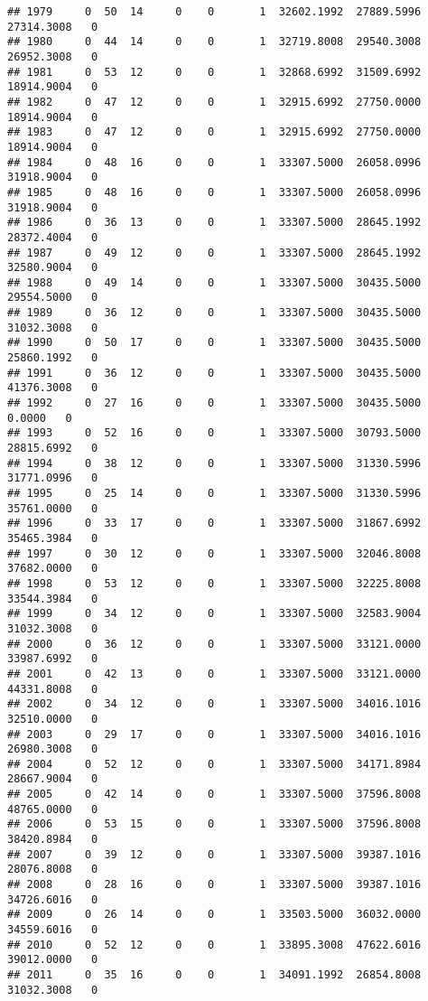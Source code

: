 \documentclass[
]{article}
\begin{document}
\begin{enumerate}
\begin{verbatim}
## 1979     0  50  14     0    0       1  32602.1992  27889.5996  27314.3008   0
## 1980     0  44  14     0    0       1  32719.8008  29540.3008  26952.3008   0
## 1981     0  53  12     0    0       1  32868.6992  31509.6992  18914.9004   0
## 1982     0  47  12     0    0       1  32915.6992  27750.0000  18914.9004   0
## 1983     0  47  12     0    0       1  32915.6992  27750.0000  18914.9004   0
## 1984     0  48  16     0    0       1  33307.5000  26058.0996  31918.9004   0
## 1985     0  48  16     0    0       1  33307.5000  26058.0996  31918.9004   0
## 1986     0  36  13     0    0       1  33307.5000  28645.1992  28372.4004   0
## 1987     0  49  12     0    0       1  33307.5000  28645.1992  32580.9004   0
## 1988     0  49  14     0    0       1  33307.5000  30435.5000  29554.5000   0
## 1989     0  36  12     0    0       1  33307.5000  30435.5000  31032.3008   0
## 1990     0  50  17     0    0       1  33307.5000  30435.5000  25860.1992   0
## 1991     0  36  12     0    0       1  33307.5000  30435.5000  41376.3008   0
## 1992     0  27  16     0    0       1  33307.5000  30435.5000      0.0000   0
## 1993     0  52  16     0    0       1  33307.5000  30793.5000  28815.6992   0
## 1994     0  38  12     0    0       1  33307.5000  31330.5996  31771.0996   0
## 1995     0  25  14     0    0       1  33307.5000  31330.5996  35761.0000   0
## 1996     0  33  17     0    0       1  33307.5000  31867.6992  35465.3984   0
## 1997     0  30  12     0    0       1  33307.5000  32046.8008  37682.0000   0
## 1998     0  53  12     0    0       1  33307.5000  32225.8008  33544.3984   0
## 1999     0  34  12     0    0       1  33307.5000  32583.9004  31032.3008   0
## 2000     0  36  12     0    0       1  33307.5000  33121.0000  33987.6992   0
## 2001     0  42  13     0    0       1  33307.5000  33121.0000  44331.8008   0
## 2002     0  34  12     0    0       1  33307.5000  34016.1016  32510.0000   0
## 2003     0  29  17     0    0       1  33307.5000  34016.1016  26980.3008   0
## 2004     0  52  12     0    0       1  33307.5000  34171.8984  28667.9004   0
## 2005     0  42  14     0    0       1  33307.5000  37596.8008  48765.0000   0
## 2006     0  53  15     0    0       1  33307.5000  37596.8008  38420.8984   0
## 2007     0  39  12     0    0       1  33307.5000  39387.1016  28076.8008   0
## 2008     0  28  16     0    0       1  33307.5000  39387.1016  34726.6016   0
## 2009     0  26  14     0    0       1  33503.5000  36032.0000  34559.6016   0
## 2010     0  52  12     0    0       1  33895.3008  47622.6016  39012.0000   0
## 2011     0  35  16     0    0       1  34091.1992  26854.8008  31032.3008   0

\end{verbatim}
\end{enumerate}
\end{document}
